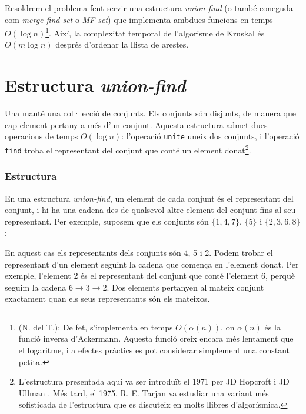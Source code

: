 Resoldrem el problema fent servir una estructura \emph{union-find} (o
també coneguda com \emph{merge-find-set} o \emph{MF set}) que
implementa ambdues funcions en temps $O(\log n)$\footnote{(N. del T.): De
fet, s’implementa en temps $O(\alpha(n))$, on $\alpha(n)$ és la funció inversa d’Ackermann. Aquesta funció creix encara més lentament que el logaritme, i
a efectes pràctics es pot considerar simplement una constant petita.}.
Així, la complexitat temporal de l'algorisme de Kruskal és
$O(m \log n)$ després d'ordenar la llista de arestes.

\section{Estructura \emph{union-find}}
\label{union-find}


Una  manté una col·lecció de
conjunts. Els conjunts són disjunts, de manera que cap element pertany
a més d'un conjunt. Aquesta estructura admet dues operacions de temps
$O(\log n)$: l'operació \texttt{unite} uneix dos conjunts, i
l'operació \texttt{find} troba el representant del conjunt que conté
un element donat\footnote{L'estructura presentada aquí va ser
introduït el 1971 per JD Hopcroft i JD Ullman \cite{hop71}. Més tard,
el 1975, R. E. Tarjan va estudiar una variant més sofisticada de
l'estructura \cite{tar75} que es discuteix en molts llibres
d'algorísmica.}.

\subsubsection{Estructura}

En una estructura \emph{union-find}, un element de cada conjunt és el
representant del conjunt, i hi ha una cadena des de qualsevol altre
element del conjunt fins al seu representant. Per exemple, suposem que
els conjunts són $\{1,4,7\}$, $\{5\}$ i $\{2,3,6,8\}$:
\begin{center}
\end{center}
En aquest cas els representants dels conjunts són 4, 5 i 2. Podem
trobar el representant d'un element seguint la cadena que
comença en l'element donat. Per exemple, l'element 2 és el representant del conjunt
que conté l'element 6, perquè seguim la cadena $6 \rightarrow 3 \rightarrow
2$. Dos elements pertanyen al mateix conjunt exactament quan els seus
representants són els mateixos.

